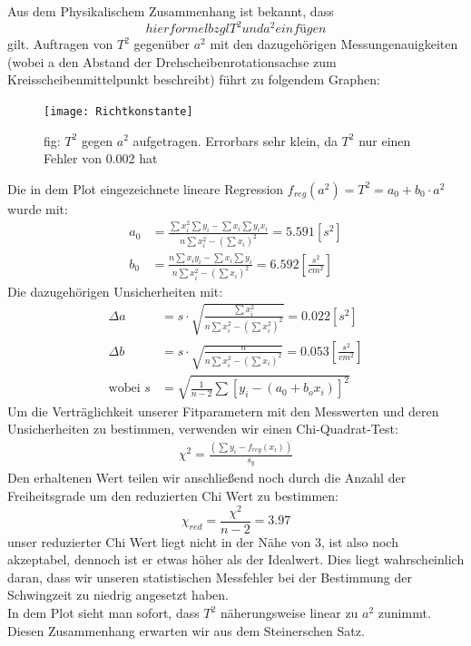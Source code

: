 \documentclass[11pt,a4paper]{article}
\begin{document}
	Aus dem Physikalischem Zusammenhang ist bekannt, dass
	\begin{equation}
	hier formel bzgl T^2 und a^2 einfügen
	\end{equation}
	gilt.
	Auftragen von $T^2$ gegenüber $a^2$ mit den dazugehörigen Messungenauigkeiten (wobei a den Abstand der Drehscheibenrotationsachse zum Kreisscheibenmittelpunkt beschreibt) führt zu folgendem Graphen:\\
	\begin{figure}[H]
	\texttt{[image: Richtkonstante]}
	\caption[]{fig: $T^2$ gegen $a^2$ aufgetragen. Errorbars sehr klein, da $T^2$ nur einen Fehler von 0.002 hat}
	\end{figure}
	Die in dem Plot eingezeichnete lineare Regression $f_{reg}(a^2)=T^2=a_0 + b_0 \cdot a^2$ wurde mit:
	\begin{align}
	a_0 &= \frac{\sum x_i^2 \sum y_i -\sum x_i \sum y_i x_i}{n\sum x_i^2 -(\sum x_i)^2}=5.591[s^2]\\
	b_0 &= \frac{n \sum x_i y_i - \sum x_i \sum y_i}{n \sum x_i^2 - (\sum x_i)^2}=6.592 [\frac{s^2}{cm^2}]
	\end{align}
	Die dazugehörigen Unsicherheiten mit:
	\begin{align}
	\Delta a &= s \cdot \sqrt{\frac{\sum x_i^2}{n \sum x_i^2 - (\sum x_i^2)^2}}=0.022[s^2]\\
	\Delta b &= s \cdot \sqrt{\frac{n}{n \sum x_i^2 - (\sum x_i)^2}}=0.053[\frac{s^2}{cm^2}]\\
	 \text{wobei  } s&=\sqrt{\frac{1}{n-2} \sum [y_i -( a_0 + b_o x_i)]^2}
	\end{align}
	Um die Verträglichkeit unserer Fitparametern mit den Messwerten und deren Unsicherheiten zu bestimmen,
	verwenden wir einen Chi-Quadrat-Test:
	\begin{align}
	\chi ^2 = \frac{(\sum y_i - f_{reg}(x_i))}{s_y}
	\end{align}
	Den erhaltenen Wert teilen wir anschließend noch durch die Anzahl der Freiheitsgrade um den reduzierten Chi Wert zu bestimmen:
	$$\chi _{red} = \frac{\chi ^2 }{n-2} =3.97$$
	unser reduzierter Chi Wert liegt nicht in der Nähe von 3, ist also noch akzeptabel, dennoch ist er etwas höher als der Idealwert.
	Dies liegt wahrscheinlich daran, dass wir unseren statistischen Messfehler bei der Bestimmung der Schwingzeit zu niedrig angesetzt haben.\vspace{2cm}\\
	In dem Plot sieht man sofort, dass $T^2$ näherungsweise linear zu $a^2$ zunimmt. Diesen Zusammenhang erwarten wir aus dem Steinerschen Satz.
	\\
\end{document}
